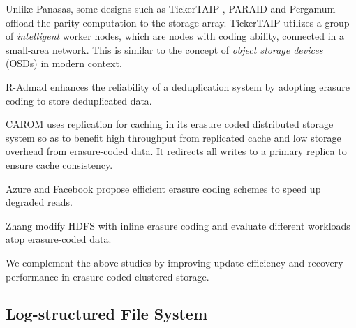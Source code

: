 Unlike Panasas, some designs such as TickerTAIP \cite{cao94}, PARAID
\cite{weddle07} and Pergamum \cite{storer08} offload the parity computation to
the storage array. TickerTAIP utilizes a group of \textit{intelligent} worker
nodes, which are nodes with coding ability, connected in a small-area network.
This is similar to the concept of \textit{object storage devices} (OSDs) in
modern context. %

R-Admad \cite{liu09} enhances the reliability of a deduplication
system by adopting erasure coding to store deduplicated data.  

CAROM \cite{ma13} uses replication for caching in its erasure coded distributed
storage system so as to benefit high throughput from replicated cache and low
storage overhead from erasure-coded data. It redirects all writes to a primary
replica to ensure cache consistency. 

Azure \cite{huang12} and Facebook \cite{sathiamoorthy13} propose efficient
erasure coding schemes to speed up degraded reads. 

Zhang \etal \cite{zhang10} modify HDFS with inline erasure coding and
evaluate different workloads atop erasure-coded data.

We complement the above studies by improving update efficiency and recovery
performance in erasure-coded clustered storage. 


\subsection{Log-structured File System}



